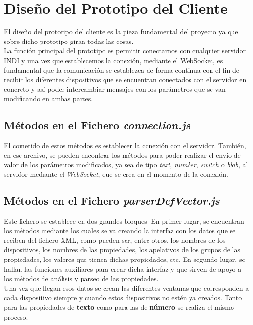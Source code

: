 \section{Diseño del Prototipo del Cliente}
El diseño del prototipo del cliente es la pieza fundamental del proyecto ya que sobre dicho prototipo giran todas las cosas.\\

La función principal del prototipo es permitir conectarnos con cualquier servidor INDI y una vez que establecemos la conexión, mediante el WebSocket, es fundamental que la comunicación se establezca de forma continua con el fin de recibir los diferentes dispositivos que se encuentran conectados con el servidor en concreto y así poder intercambiar mensajes con los parámetros que se van modificando en ambas partes.

\subsection{Métodos en el Fichero \textit{connection.js}}
El cometido de estos métodos es establecer la conexión con el servidor.
También, en ese archivo, se pueden encontrar los métodos para poder realizar el envío de valor de los parámetros modificados, ya sea de tipo \textit{text}, \textit{number}, \textit{switch} o \textit{blob}, al servidor mediante el \textit{WebSocket}, que se crea en el momento de la conexión.

\subsection{Métodos en el Fichero \textit{parserDefVector.js}}
Este fichero se establece en dos grandes bloques. En primer lugar, se encuentran los métodos mediante los cuales se va creando la interfaz con los datos que se reciben del fichero XML, como pueden ser, entre otros, los nombres de los dispositivos, los nombres de las propiedades, los apelativos de los grupos de las propiedades, los valores que tienen dichas propiedades, etc. En segundo lugar, se hallan las funciones auxiliares para crear dicha interfaz y que sirven de apoyo a los métodos de análisis y parseo de las propiedades.\\

Una vez que llegan esos datos se crean las diferentes ventanas que corresponden a cada dispositivo siempre y cuando estos dispositivos no estén ya creados.
Tanto para las propiedades de \textbf{texto} como para las de \textbf{número} se realiza el mismo proceso.\\

